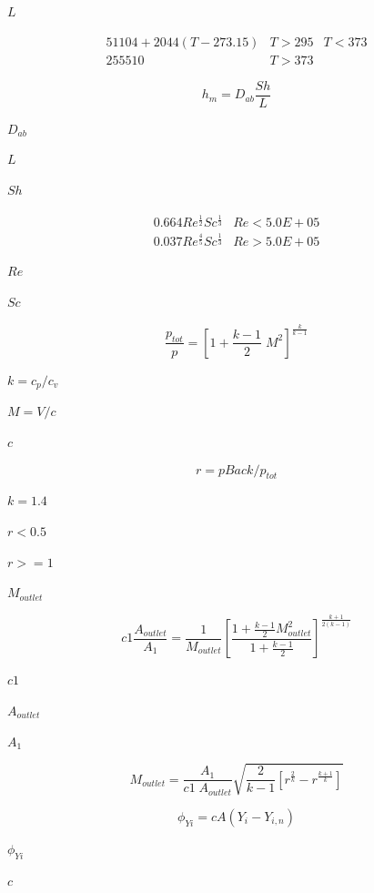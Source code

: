 \documentclass{article}
\begin{document}
$        L       $
\pagebreak

\begin{eqnarray*}
    51104 + 2044 (T - 273.15)   & T > 295 & T < 373 \\
    255510                      & T > 373 &
\end{eqnarray*}
\pagebreak

\[ h_m = D_{ab} \frac{Sh}{L} \]
\pagebreak

$        D_{ab} $
\pagebreak

$        L      $
\pagebreak

$        Sh     $
\pagebreak

\begin{eqnarray*}
            0.664 Re^\frac{1}{2} Sc^\frac{1}{3} & Re < 5.0E+05 \\
            0.037 Re^\frac{4}{5} Sc^\frac{1}{3} & Re > 5.0E+05
    \end{eqnarray*}
\pagebreak

$        Re     $
\pagebreak

$        Sc     $
\pagebreak

\[
    \frac{p_{tot}}{p}=\left[ 1+ \frac{k-1}{2}\;M^2 \right]^{\frac{k}{k-1}}
\]
\pagebreak

$k=c_p/c_v$
\pagebreak

$M=V/c$
\pagebreak

$c$
\pagebreak

\[
    r =  pBack/p_{tot}
\]
\pagebreak

$k=1.4$
\pagebreak

$ r<0.5$
\pagebreak

$ r>=1 $
\pagebreak

$M_{outlet}$
\pagebreak

\[
    c1\frac{A_{outlet}}{A_1}=\frac{1}{M_{outlet}}\left[\frac{1+\frac{k-1}{2}
    M_{outlet}^2}{1+\frac{k-1}{2}}\right]^{\frac{k+1}{2(k-1)}}
\]
\pagebreak

$c1$
\pagebreak

$A_{outlet}$
\pagebreak

$A_1$
\pagebreak

\[
    M_{outlet} =
        \frac{A_1}
        {c1\;A_{outlet}}
        \sqrt{\frac{2}{k-1}\left[r^\frac{2}{k}-r^\frac{k+1}{k} \right]}
\]
\pagebreak

\[
        \phi_{Yi} = c A (Y_i - Y_{i,n})
    \]
\pagebreak

$            \phi_{Yi} $
\pagebreak

$            c         $
\pagebreak
\end{document}
